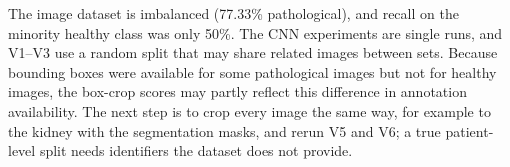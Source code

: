 The image dataset is imbalanced (77.33\% pathological), and recall on the minority healthy class was only 50\%. The CNN experiments are single runs, and V1--V3 use a random split that may share related images between sets. Because bounding boxes were available for some pathological images but not for healthy images, the box-crop scores may partly reflect this difference in annotation availability. The next step is to crop every image the same way, for example to the kidney with the segmentation masks, and rerun V5 and V6; a true patient-level split needs identifiers the dataset does not provide.
